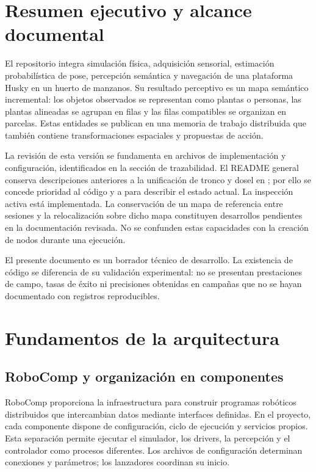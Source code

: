 \section{Resumen ejecutivo y alcance documental}
El repositorio  integra simulación física, adquisición sensorial, estimación probabilística de pose, percepción semántica y navegación de una plataforma Husky en un huerto de manzanos. Su resultado perceptivo es un mapa semántico incremental: los objetos observados se representan como plantas o personas, las plantas alineadas se agrupan en filas y las filas compatibles se organizan en parcelas. Estas entidades se publican en una memoria de trabajo distribuida que también contiene transformaciones espaciales y propuestas de acción.

La revisión de esta versión se fundamenta en archivos de implementación y configuración, identificados en la sección de trazabilidad. El README general conserva descripciones anteriores a la unificación de tronco y dosel en ; por ello se concede prioridad al código y a  para describir el estado actual. La inspección activa está implementada. La conservación de un mapa de referencia entre sesiones y la relocalización sobre dicho mapa constituyen desarrollos pendientes en la documentación revisada. No se confunden estas capacidades con la creación de nodos durante una ejecución.

El presente documento es un borrador técnico de desarrollo. La existencia de código se diferencia de su validación experimental: no se presentan prestaciones de campo, tasas de éxito ni precisiones obtenidas en campañas que no se hayan documentado con registros reproducibles.

\section{Fundamentos de la arquitectura}
\subsection{RoboComp y organización en componentes}
RoboComp proporciona la infraestructura para construir programas robóticos distribuidos que intercambian datos mediante interfaces definidas. En el proyecto, cada componente dispone de configuración, ciclo de ejecución y servicios propios. Esta separación permite ejecutar el simulador, los drivers, la percepción y el controlador como procesos diferentes. Los archivos de configuración determinan conexiones y parámetros; los lanzadores coordinan su inicio.

